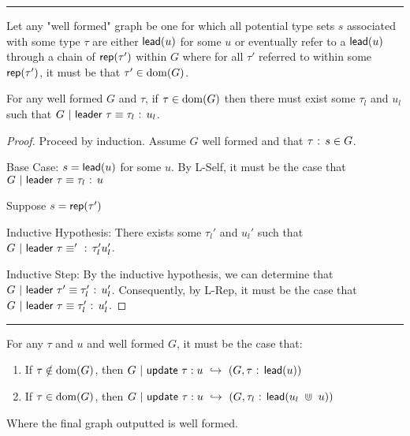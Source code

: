 \noindent\rule{\textwidth}{1pt}

\begin{lemma}[name=Leader Correctness]
Let any "well formed" graph be one for which all potential type sets $s$ associated with some type $\tau$ are either $\normalfont\textsf{lead}(u)$ for some $u$ or eventually refer to a $\normalfont\textsf{lead}(u)$ through a chain of $\normalfont\textsf{rep}(\tau')$ within $G$ where for all $\tau'$ referred to within some $\normalfont\textsf{rep}(\tau')$, it must be that $\tau' \in \operatorname{dom}(G)$.

For any well formed $G$ and $\tau$, if $\tau \in \operatorname{dom}(G)$ then there must exist some $\tau_l$ and $u_l$ such that $G~|~\normalfont\textsf{leader}~\tau \equiv \tau_l\normalfont\textsf{ : }u_l$.
\end{lemma}

\begin{proof}
    Proceed by induction.
    Assume $G$ well formed and that $\tau\normalfont\textsf{ : }s \in G$.

    Base Case: $s = \normalfont\textsf{lead}(u)$ for some $u$. By L-Self, it must be the case that $G~|~\normalfont\textsf{leader}~\tau \equiv \tau_l\normalfont\textsf{ : }u$ 

    Suppose $s = \normalfont\textsf{rep}(\tau')$
    
    Inductive Hypothesis: There exists some $\tau_l'$ and $u_l'$ such that $G~|~\normalfont\textsf{leader}~\tau \equiv '\normalfont\textsf{ : }\tau_l'{u_l'}$.

    Inductive Step: By the inductive hypothesis, we can determine that $G~|~\normalfont\textsf{leader}~\tau' \equiv \tau_l'\normalfont\textsf{ : }u_l'$. Consequently, by L-Rep, it must be the case that $G~|~\normalfont\textsf{leader}~\tau \equiv \tau_l'\normalfont\textsf{ : }u_l'$.
\end{proof}

\noindent\rule{\textwidth}{1pt}

\begin{lemma}[name=Update Correctness]
For any $\tau$ and $u$ and well formed $G$, it must be the case that:
\begin{enumerate}
    \item If $\tau \notin \operatorname{dom}(G)$, then $G~|~\normalfont\textsf{update}~\tau:u ~\hookrightarrow~ (G, \tau\normalfont\textsf{ : }\normalfont\textsf{lead}(u))$
    \item If $\tau \in \operatorname{dom}(G)$, then $G~|~\normalfont\textsf{update}~\tau:u ~\hookrightarrow~ (G, \tau_l\normalfont\textsf{ : }\normalfont\textsf{lead}(u_l~\Cup~u))$
\end{enumerate}
Where the final graph outputted is well formed.
\end{lemma}


